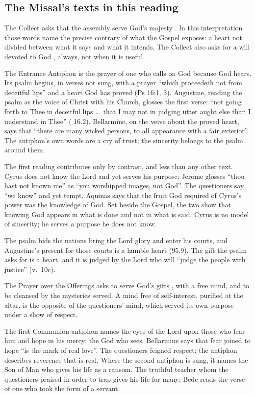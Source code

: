 \subsection{The Missal's texts in this reading}

The Collect asks that the assembly serve God's majesty .
In this interpretation those words name the precise contrary of what the
Gospel exposes: a heart not divided between what it says and what it intends.
The Collect also asks for a will devoted to God , always, not
when it is useful.

The Entrance Antiphon is the prayer of one who calls on God because God
hears. Its psalm begins, in verses not sung, with a prayer ``which proceedeth
not from deceitful lips'' and a heart God has proved (Ps 16:1, 3). Augustine,
reading the psalm as the voice of Christ with his Church, glosses the first
verse: ``not going forth to Thee in deceitful lips \ldots\ that I may not in
judging utter aught else than I understand in Thee'' ( 16.2). Bellarmine, on the verse about the proved heart, says that
``there are many wicked persons, to all appearance with a fair exterior''. The
antiphon's own words are a cry of trust; the sincerity belongs to the psalm
around them.

The first reading contributes only by contrast, and less than any other text.
Cyrus does not know the Lord and yet serves his purpose; Jerome glosses ``thou hast not known me'' as ``you
worshipped images, not God''. The questioners say ``we know'' and yet tempt.
Aquinas says that the fruit God required of Cyrus's power was the knowledge of
God. Set beside the Gospel, the two show that knowing God appears in what is
done and not in what is said. Cyrus is no model of sincerity; he serves a
purpose he does not know.

The psalm bids the nations bring the Lord glory and enter his courts, and
Augustine's present for those courts is a humble heart (95.9). The gift the
psalm asks for is a heart, and it is judged by the Lord who will ``judge the people with justice'' (v.~10c).

The Prayer over the Offerings asks to serve God's gifts ,
with a free mind, and to be cleansed by the mysteries served. A mind free of
self-interest, purified at the altar, is the opposite of the questioners'
mind, which served its own purpose under a show of respect.

The first Communion antiphon names the eyes of the Lord upon those who fear
him and hope in his mercy: the God who sees. Bellarmine says that fear joined
to hope ``is the mark of real love''. The questioners feigned respect; the
antiphon describes reverence that is real. Where the second antiphon is sung,
it names the Son of Man who gives his life as a ransom. The truthful teacher
whom the questioners praised in order to trap gives his life for many; Bede
reads the verse of one who took the form of a servant.

